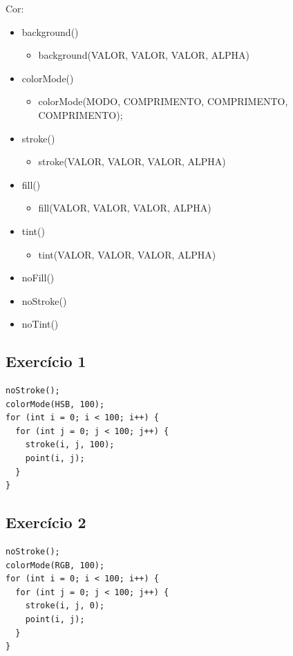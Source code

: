 \documentclass[12pt]{article}
\begin{document}
Cor:
\begin{itemize}
\item background()
\begin{itemize}
\item background(VALOR, VALOR, VALOR, ALPHA)
\end{itemize}
\item colorMode()
\begin{itemize}
\item colorMode(MODO, COMPRIMENTO, COMPRIMENTO, COMPRIMENTO);
\end{itemize}
\item stroke()
\begin{itemize}
\item stroke(VALOR, VALOR, VALOR, ALPHA)
\end{itemize}
\item fill()
\begin{itemize}
\item fill(VALOR, VALOR, VALOR, ALPHA)
\end{itemize}
\item tint()
\begin{itemize}
\item tint(VALOR, VALOR, VALOR, ALPHA)
\end{itemize}
\item noFill()
\item noStroke()
\item noTint()
\end{itemize}

\subsection{Exercício 1}

\begin{verbatim}
noStroke();
colorMode(HSB, 100);
for (int i = 0; i < 100; i++) {
  for (int j = 0; j < 100; j++) {
    stroke(i, j, 100);
    point(i, j);
  }
}
\end{verbatim}

\subsection{Exercício 2}

\begin{verbatim}
noStroke();
colorMode(RGB, 100);
for (int i = 0; i < 100; i++) {
  for (int j = 0; j < 100; j++) {
    stroke(i, j, 0);
    point(i, j);
  }
}
\end{verbatim}
\end{document}
